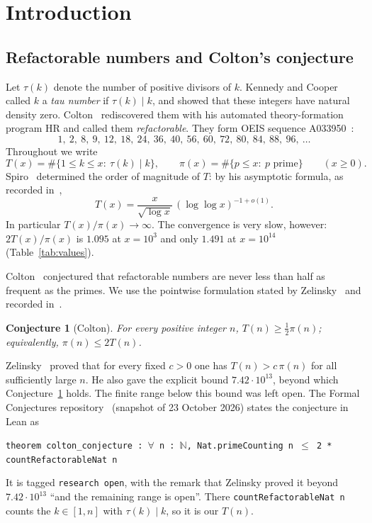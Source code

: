 \documentclass[11pt,a4paper]{article}
\newtheorem{conjecture}[theorem]{Conjecture}
\theoremstyle{definition}
\newcommand{\N}{\mathbb N}
\begin{document}
\tableofcontents

\section{Introduction}

\subsection{Refactorable numbers and Colton's conjecture}

Let $\tau(k)$ denote the number of positive divisors of $k$. Kennedy and Cooper~\cite{KC90} called $k$ a \emph{tau number} if $\tau(k)\mid k$, and showed that these integers have natural density zero. Colton~\cite{Co99} rediscovered them with his automated theory-formation program HR and called them \emph{refactorable}. They form OEIS sequence A033950~\cite{OEIS}:
\[
1,\ 2,\ 8,\ 9,\ 12,\ 18,\ 24,\ 36,\ 40,\ 56,\ 60,\ 72,\ 80,\ 84,\ 88,\ 96,\ \dots
\]
Throughout we write
\[
T(x)=\#\{1\le k\le x:\ \tau(k)\mid k\},\qquad \pi(x)=\#\{p\le x:\ p \text{ prime}\}\qquad(x\ge 0).
\]
Spiro~\cite{Sp85} determined the order of magnitude of $T$: by his asymptotic formula, as recorded in~\cite{FC},
\[
T(x)=\frac{x}{\sqrt{\log x}}\,(\log\log x)^{-1+o(1)}.
\]
In particular $T(x)/\pi(x)\to\infty$. The convergence is very slow, however: $2T(x)/\pi(x)$ is $1.095$ at $x=10^{3}$ and only $1.491$ at $x=10^{14}$ (Table~\ref{tab:values}).

Colton~\cite{Co99} conjectured that refactorable numbers are never less than half as frequent as the primes. We use the pointwise formulation stated by Zelinsky~\cite{Ze02} and recorded in~\cite{FC}.

\begin{conjecture}[Colton]\label{conj:colton}
For every positive integer $n$, $T(n)\ge\frac12\pi(n)$; equivalently, $\pi(n)\le 2T(n)$.
\end{conjecture}

Zelinsky~\cite{Ze02} proved that for every fixed $c>0$ one has $T(n)>c\,\pi(n)$ for all sufficiently large $n$. He also gave the explicit bound $7.42\cdot10^{13}$, beyond which Conjecture~\ref{conj:colton} holds. The finite range below this bound was left open. The Formal Conjectures repository~\cite{FC} (snapshot of 23 October 2026) states the conjecture in Lean as
\begin{center}
\texttt{theorem colton\_conjecture :\ $\forall$ n :\ $\N$, Nat.primeCounting n $\le$ 2 * countRefactorableNat n}
\end{center}
It is tagged \texttt{research open}, with the remark that Zelinsky proved it beyond $7.42\cdot10^{13}$ ``and the remaining range is open''. There \texttt{countRefactorableNat n} counts the $k\in[1,n]$ with $\tau(k)\mid k$, so it is our $T(n)$.
\end{document}
